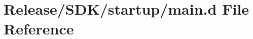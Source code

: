 \hypertarget{_release_2_s_d_k_2startup_2main_8d}{}\section{Release/\+S\+D\+K/startup/main.d File Reference}
\label{_release_2_s_d_k_2startup_2main_8d}
